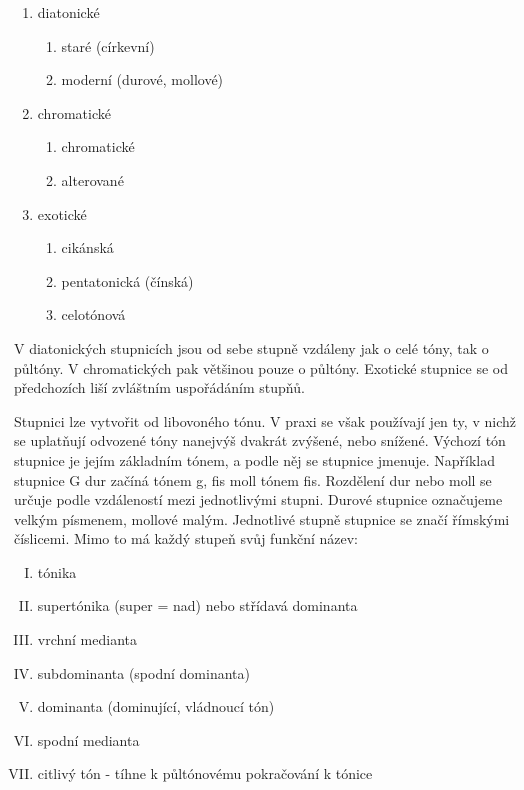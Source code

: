 \begin{enumerate}
	\item diatonické
	\begin{enumerate}
        \item staré (církevní)
        \item moderní (durové, mollové)
    \end{enumerate}
	\item chromatické
	\begin{enumerate}
        \item chromatické
        \item alterované
    \end{enumerate}
	\item exotické
	\begin{enumerate}
        \item cikánská
        \item pentatonická (čínská)
        \item celotónová
    \end{enumerate}
\end{enumerate}

V diatonických stupnicích jsou od sebe stupně vzdáleny jak o celé tóny, tak o půltóny.
V chromatických pak většinou pouze o půltóny.
Exotické stupnice se od předchozích liší zvláštním uspořádáním stupňů.\cite{kofron}
\par
Stupnici lze vytvořit od libovoného tónu.
V praxi se však používají jen ty, 
v nichž se uplatňují odvozené tóny nanejvýš dvakrát zvýšené, nebo snížené.
Výchozí tón stupnice je jejím základním tónem, a podle něj se stupnice jmenuje.
Například stupnice G dur začíná tónem g, fis moll tónem fis.
Rozdělení dur nebo moll se určuje podle vzdáleností mezi jednotlivými stupni.\cite{zenkl}
Durové stupnice označujeme velkým písmenem, mollové malým.
Jednotlivé stupně stupnice se značí římskými číslicemi.
Mimo to má každý stupeň svůj funkční název:\cite{kofron}

\begin{enumerate} [I.]
    \item tónika
    \item supertónika (super = nad) nebo střídavá dominanta
    \item vrchní medianta
    \item subdominanta (spodní dominanta)
    \item dominanta (dominující, vládnoucí tón)
    \item spodní medianta
    \item citlivý tón - tíhne k půltónovému pokračování k tónice
\end{enumerate}

